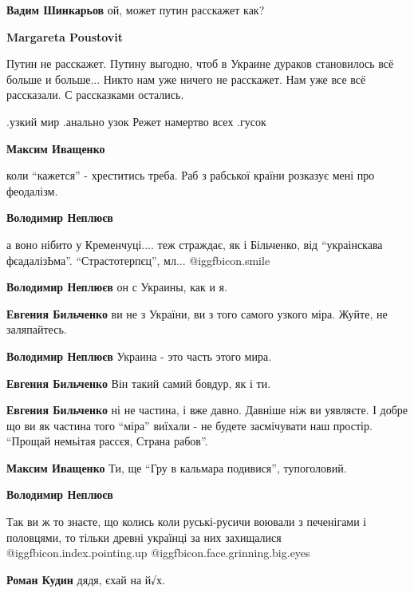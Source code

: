\begin{itemize}
\begin{itemize}
\textbf{Вадим Шинкарьов} ой, может путин расскажет как?

\textbf{Margareta Poustovit} 

Путин не расскажет. Путину выгодно, чтоб в Украине дураков становилось всё
больше и больше... Никто нам уже ничего не расскажет. Нам уже все всё
рассказали. С рассказками остались.

\end{itemize} %

.узкий мир .анально узок
Режет намертво всех .гусок

\begin{itemize} %
\textbf{Максим Иващенко} 

коли \enquote{кажется} - хреститись треба.
Раб з рабської країни розказує мені про феодалізм.

\textbf{Володимир Неплюєв} 

а воно нібито у Кременчуці.... теж страждає, як і Більченко, від \enquote{украінскава
фєадалізЬма}. \enquote{Страстотерпєц}, мл...  @igg{fbicon.smile} 


\textbf{Володимир Неплюєв} он с Украины, как и я.

\textbf{Евгения Бильченко} ви не з України, ви з того самого узкого міра.
Жуйте, не заляпайтесь.

\textbf{Володимир Неплюєв} Украина - это часть этого мира.

\textbf{Евгения Бильченко} Він такий самий бовдур, як і ти.

\textbf{Евгения Бильченко} ні не частина, і вже давно.
Давніше ніж ви уявляєте.
І добре що ви як частина того \enquote{міра} виїхали - не будете засмічувати наш простір.
\enquote{Прощай немьітая рассєя,
Страна рабов}.

\textbf{Максим Иващенко} Ти, ще \enquote{Гру в кальмара подивися}, тупоголовий.

\textbf{Володимир Неплюєв} 

Так ви ж то знаєте, що колись коли руські-русичи воювали з печенігами і
половцями, то тільки древні українці за них
захищалися @igg{fbicon.index.pointing.up} @igg{fbicon.face.grinning.big.eyes} 


\textbf{Роман Кудин} дядя, єхай на й√х.


\end{itemize}
\end{itemize}
